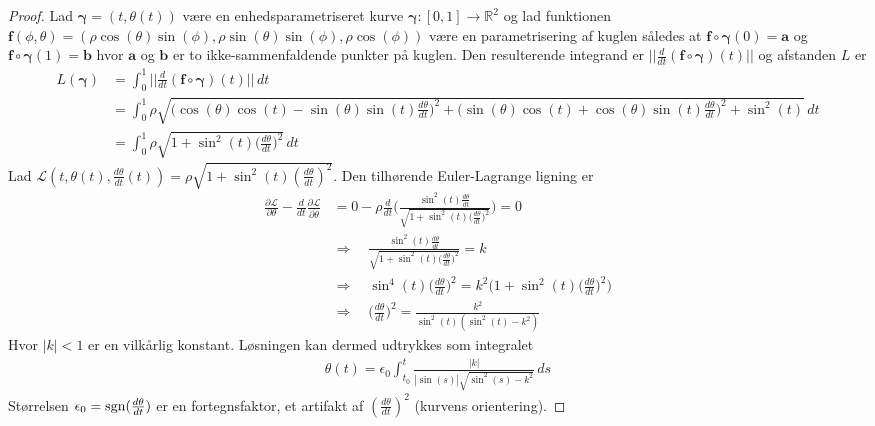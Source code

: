 \documentclass[12pt]{article}
\begin{document}
\begin{proof}
Lad ${\boldsymbol \gamma} =(t, \theta(t)) $ være en enhedsparametriseret kurve ${\boldsymbol \gamma} : [0,1] \rightarrow \mathbb{R}^2$ og lad funktionen $\mathbf{f}(\phi,\theta) = (\rho\cos(\theta)\sin(\phi), \rho\sin(\theta)\sin(\phi), \rho\cos(\phi))$ være en parametrisering af kuglen således at $\mathbf{f} \circ {\boldsymbol \gamma}(0)=\mathbf{a}$ og $\mathbf{f} \circ {\boldsymbol \gamma}(1)=\mathbf{b}$ hvor $\mathbf{a}$ og $\mathbf{b}$ er to ikke-sammenfaldende punkter på kuglen. Den resulterende integrand er $|| \frac{d}{dt}(\mathbf{f} \circ {\boldsymbol \gamma})(t) ||$ og afstanden $L$ er
\begin{align*}
L({\boldsymbol \gamma}) &= \int_0^1 ||\frac{d}{dt}(\mathbf{f} \circ {\boldsymbol \gamma})(t) || \, dt \\
&= \int_0^1 \rho\sqrt{\big( \cos(\theta)\cos(t)-\sin(\theta)\sin(t) \frac{d\theta}{dt} \big)^2 + \big(\sin(\theta)\cos(t)+\cos(\theta)\sin(t) \frac{d\theta}{dt} \big)^2 + \sin^2(t)} \, dt\\
&= \int_0^1 \rho\sqrt{1+\sin^2(t) \big(\frac{d\theta}{dt} \big)^2} \, dt
\end{align*}
Lad $\mathcal{L}(t,\theta(t),\frac{d\theta}{dt}(t))= \rho\sqrt{1+\sin^2(t) (\frac{d\theta}{dt})^2}$. Den tilhørende Euler-Lagrange ligning er
\begin{align*}
\frac{\partial \mathcal{L}}{\partial \theta} - \frac{d}{dt} \frac{\partial \mathcal{L}}{\partial \dot{\theta}} &= 0-\rho \frac{d}{dt}\Big( \frac{\sin^2(t)\frac{d\theta}{dt}}{\sqrt{1+\sin^2(t) \big(\frac{d\theta}{dt} \big)^2}} \Big) = 0 \\
&\Rightarrow \quad \frac{\sin^2(t)\frac{d\theta}{dt}}{\sqrt{1+\sin^2(t) \big(\frac{d\theta}{dt} \big)^2}} = k \\
&\Rightarrow \quad
\sin^4(t)\big(\frac{d\theta}{dt} \big)^2 = k^2 \Big( 1+\sin^2(t) \big(\frac{d\theta}{dt} \big)^2 \Big) \\
&\Rightarrow \quad
\big(\frac{d\theta}{dt} \big)^2 = \frac{k^2}{\sin^2(t)(\sin^2(t)-k^2)}
\end{align*}
Hvor $|k|<1$ er en vilkårlig konstant. Løsningen kan dermed udtrykkes som integralet
\begin{align*}
\theta(t) = \epsilon_0 \int_{t_0}^t \frac{|k|}{|\sin(s)|\sqrt{\sin^2(s)-k^2}} \, ds
\end{align*}
Størrelsen $\epsilon_0 = \textnormal{sgn}(\frac{d\theta}{dt}) $ er en fortegnsfaktor, et artifakt af $(\frac{d\theta}{dt})^2$ (kurvens orientering).



\end{proof}
\end{document}
